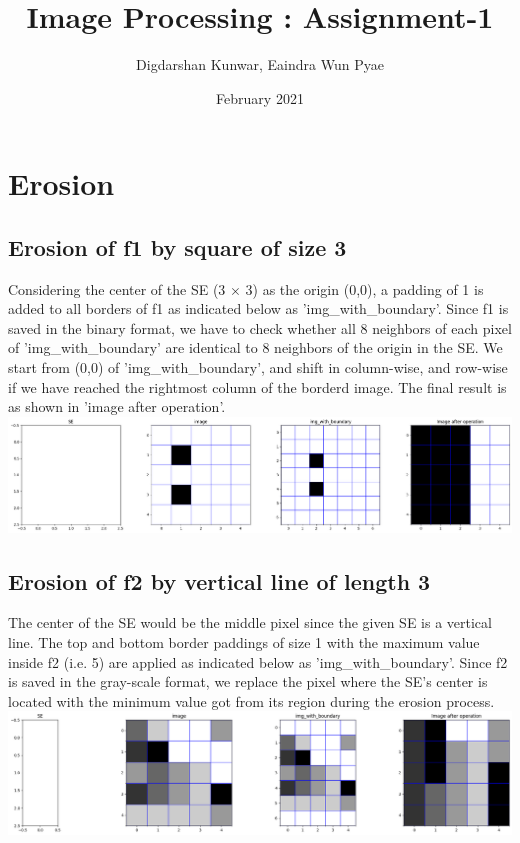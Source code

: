 \documentclass{article}
\title{Image Processing : Assignment-1}
\author{Digdarshan Kunwar, Eaindra Wun Pyae}
\date{February 2021}
\begin{document}
\maketitle

\section{Erosion}
\subsection{Erosion of f1 by square of size 3}
Considering the center of the SE (3 $\times$ 3) as the origin (0,0), a padding of 1 is added to all borders of f1 as indicated below as 'img\_with\_boundary'. Since f1 is saved in the binary format, we have to check whether all 8 neighbors of each pixel of 'img\_with\_boundary' are identical to 8 neighbors of the origin in the SE. We start from (0,0) of 'img\_with\_boundary', and shift in column-wise, and row-wise if we have reached the rightmost column of the borderd image. The final result is as shown in 'image after operation'. \\
\includegraphics[width=\linewidth]{images/ef1_e1.png}
\\ 


\subsection{Erosion of f2 by vertical line of length 3 }
 The center of the SE would be the middle pixel since the given SE is a vertical line. The top and bottom border paddings of size 1 with the maximum value inside f2 (i.e. 5) are applied as indicated below as 'img\_with\_boundary'. Since f2 is saved in the gray-scale format, we replace the pixel where the SE's center is located with the minimum value got from its region during the erosion process.  \\
\includegraphics[width=\linewidth]{images/ef2_e2.png}
\\
\end{document}
